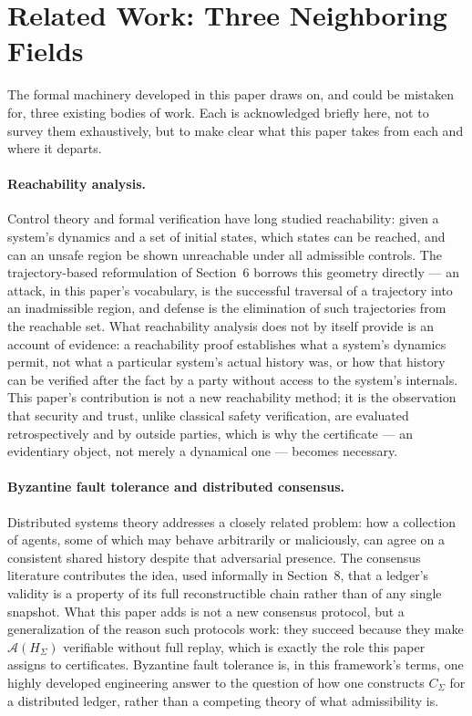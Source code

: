 \documentclass[11pt]{article}
\begin{document}
\section{Related Work: Three Neighboring Fields}

The formal machinery developed in this paper draws on, and could be mistaken for, three existing bodies of work. Each is acknowledged briefly here, not to survey them exhaustively, but to make clear what this paper takes from each and where it departs.

\paragraph{Reachability analysis.} Control theory and formal verification have long studied reachability: given a system's dynamics and a set of initial states, which states can be reached, and can an unsafe region be shown unreachable under all admissible controls. The trajectory-based reformulation of Section~6 borrows this geometry directly --- an attack, in this paper's vocabulary, is the successful traversal of a trajectory into an inadmissible region, and defense is the elimination of such trajectories from the reachable set. What reachability analysis does not by itself provide is an account of evidence: a reachability proof establishes what a system's dynamics permit, not what a particular system's actual history was, or how that history can be verified after the fact by a party without access to the system's internals. This paper's contribution is not a new reachability method; it is the observation that security and trust, unlike classical safety verification, are evaluated retrospectively and by outside parties, which is why the certificate --- an evidentiary object, not merely a dynamical one --- becomes necessary.

\paragraph{Byzantine fault tolerance and distributed consensus.} Distributed systems theory addresses a closely related problem: how a collection of agents, some of which may behave arbitrarily or maliciously, can agree on a consistent shared history despite that adversarial presence. The consensus literature contributes the idea, used informally in Section~8, that a ledger's validity is a property of its full reconstructible chain rather than of any single snapshot. What this paper adds is not a new consensus protocol, but a generalization of the reason such protocols work: they succeed because they make $\mathcal{A}(H_\Sigma)$ verifiable without full replay, which is exactly the role this paper assigns to certificates. Byzantine fault tolerance is, in this framework's terms, one highly developed engineering answer to the question of how one constructs $C_\Sigma$ for a distributed ledger, rather than a competing theory of what admissibility is.
\end{document}
